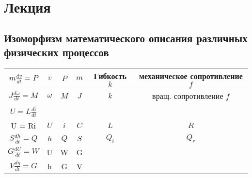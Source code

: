 \section{Лекция }
\subsection{Изоморфизм математического описания различных физических процессов}
\begin{table}[h]
	\centering
	\begin{tabular}{|c|c|c|c|c|c|}
		\hline
		$m\frac{dv}{dt}=P$ & $v$ & $P$ & $m$ & Гибкость $k$ & механическое
		сопротивление $f$\\
		\hline
		$J\frac{d\omega}{dt} = M$ & $\omega$ & $M$ & $J$ & $k$ & вращ. сопротивление
		$f$\\
		\hline
		\makecell{$i = C\frac{dU}{dt}$\\ $U = L\frac{di}{dt}$\\ U = Ri} & $U$ & $i$ 
			& $C$ & $L$ & $R$\\
		\hline
		$S\frac{dh}{dt}=Q$ & $h$ & $Q$ & $S$ & $Q_i$ & $Q_r$\\
		\hline
		$G\frac{dU}{dt} = W$  & U & W & G &\, &\, \\ 
		\hline
		$V\frac{d\eta}{dt} = G$ & h & G & V & \, & \,\\
		\hline
	\end{tabular}
\end{table}


